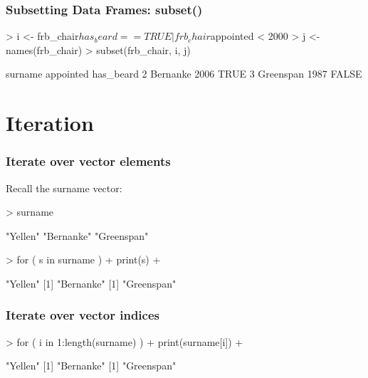 \documentclass{beamer}
\begin{document}
\begin{frame}[fragile]
\frametitle{Subsetting Data Frames: subset()}

\begin{Schunk}
\begin{Sinput}
> i <- frb_chair$has_beard == TRUE | frb_chair$appointed < 2000
> j <- names(frb_chair)
> subset(frb_chair, i, j) 
\end{Sinput}
\end{Schunk}
\pause
\begin{Schunk}
\begin{Soutput}
    surname appointed has_beard
2  Bernanke      2006      TRUE
3 Greenspan      1987     FALSE
\end{Soutput}
\end{Schunk}
\end{frame}


\section{Iteration}
\begin{frame}[fragile]
\frametitle{Iterate over vector elements}
Recall the surname vector:
\begin{Schunk}
\begin{Sinput}
> surname
\end{Sinput}
\begin{Soutput}
[1] "Yellen"    "Bernanke"  "Greenspan"
\end{Soutput}
\end{Schunk}
\pause
\begin{Schunk}
\begin{Sinput}
> for ( s in surname ) {
+     print(s)
+ }
\end{Sinput}
\end{Schunk}
\pause
\begin{Schunk}
\begin{Soutput}
[1] "Yellen"
[1] "Bernanke"
[1] "Greenspan"
\end{Soutput}
\end{Schunk}

\end{frame}


\begin{frame}[fragile]
\frametitle{Iterate over vector indices}
\begin{Schunk}
\begin{Sinput}
> for ( i in 1:length(surname) ) {
+     print(surname[i])
+ }
\end{Sinput}
\end{Schunk}
\pause
\begin{Schunk}
\begin{Soutput}
[1] "Yellen"
[1] "Bernanke"
[1] "Greenspan"
\end{Soutput}
\end{Schunk}

\end{frame}
\end{document}
